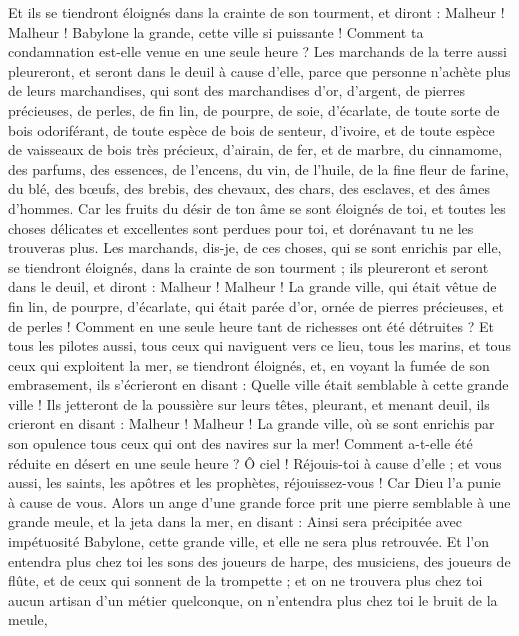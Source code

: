 \begin{multicols}{2}
Et ils se tiendront éloignés dans la crainte de son tourment, et diront : Malheur ! Malheur ! Babylone la grande, cette ville si puissante ! Comment ta condamnation est-elle venue en une seule heure ?
Les marchands de la terre aussi pleureront, et seront dans le deuil à cause d'elle, parce que personne n'achète plus de leurs marchandises,
qui sont des marchandises d'or, d'argent, de pierres précieuses, de perles, de fin lin, de pourpre, de soie, d'écarlate, de toute sorte de bois odoriférant, de toute espèce de bois de senteur, d'ivoire, et de toute espèce de vaisseaux de bois très précieux, d'airain, de fer, et de marbre,
du cinnamome, des parfums, des essences, de l'encens, du vin, de l'huile, de la fine fleur de farine, du blé, des bœufs, des brebis, des chevaux, des chars, des esclaves, et des âmes d'hommes.
Car les fruits du désir de ton âme se sont éloignés de toi, et toutes les choses délicates et excellentes sont perdues pour toi, et dorénavant tu ne les trouveras plus.
Les marchands, dis-je, de ces choses, qui se sont enrichis par elle, se tiendront éloignés, dans la crainte de son tourment ; ils pleureront et seront dans le deuil,
et diront : Malheur ! Malheur ! La grande ville, qui était vêtue de fin lin, de pourpre, d'écarlate, qui était parée d'or, ornée de pierres précieuses, et de perles ! Comment en une seule heure tant de richesses ont été détruites ?
Et tous les pilotes aussi, tous ceux qui naviguent vers ce lieu, tous les marins, et tous ceux qui exploitent la mer, se tiendront éloignés,
et, en voyant la fumée de son embrasement, ils s'écrieront en disant : Quelle ville était semblable à cette grande ville !
Ils jetteront de la poussière sur leurs têtes, pleurant, et menant deuil, ils crieront en disant : Malheur ! Malheur ! La grande ville, où se sont enrichis par son opulence tous ceux qui ont des navires sur la mer! Comment a-t-elle été réduite en désert en une seule heure ?
Ô ciel ! Réjouis-toi à cause d'elle ; et vous aussi, les saints, les apôtres et les prophètes, réjouissez-vous ! Car Dieu l'a punie à cause de vous.
Alors un ange d'une grande force prit une pierre semblable à une grande meule, et la jeta dans la mer, en disant : Ainsi sera précipitée avec impétuosité Babylone, cette grande ville, et elle ne sera plus retrouvée.
Et l'on entendra plus chez toi les sons des joueurs de harpe, des musiciens, des joueurs de flûte, et de ceux qui sonnent de la trompette ; et on ne trouvera plus chez toi aucun artisan d'un métier quelconque, on n'entendra plus chez toi le bruit de la meule,

\end{multicols}

